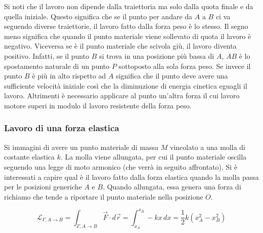 \FloatBarrier
Si noti che il lavoro non dipende dalla traiettoria ma solo dalla quota finale e da quella iniziale. Questo significa che se il punto per andare da $A$ a $B$ ci va seguendo diverse traiettorie, il lavoro fatto dalla forza peso è lo stesso. Il segno meno significa che quando il punto materiale viene sollevato di quota il lavoro è negativo. Viceversa se è il punto materiale che scivola giù, il lavoro diventa positivo. Infatti, se il punto $B$ si trova in una posizione più bassa di $A$, $AB$ è lo spostamento naturale di un punto $P$ sottoposto alla sola forza peso. Se invece il punto $B$ è più in alto rispetto ad $A$ significa che il punto deve avere una sufficiente velocità iniziale così che la diminuzione di energia cinetica eguagli il lavoro. Altrimenti è necessario applicare al punto un'altra forza il cui lavoro motore superi in modulo il lavoro resistente della forza peso.

\subsubsection{Lavoro di una forza elastica}

Si immagini di avere un punto materiale di massa $M$ vincolato a una molla di costante elastica $k$. La molla viene allungata, per cui il punto materiale oscilla seguendo una legge di moto armonico (che verrà in seguito affrontato). Si è interessati a capire qual è il lavoro fatto dalla forza elastica quando la molla passa per le posizioni generiche $A$ e $B$. Quando allungata, essa genera una forza di richiamo che tende a riportare il punto materiale nella posizione $O$.

\[
	\boxed{\mathcal{L}_{\Gamma, A \to B}=\int_{\Gamma, A \to B} \vec{F}\cdot d\vec{r}= \int_{x_A}^{x_B} -kx\,dx=\frac{1}{2}k(x_A^2-x_B^2)}
\]

